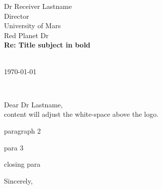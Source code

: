 \documentclass[11pt,a4paper]{letter}
\def\opening#1{\thispagestyle{empty}
{\centering\fromaddress \vspace{1.1in} \\
\hspace*{\longindentation}\today \hspace*{\fill}\par} %
{\raggedright \toname \\ \toaddress \par} %
\vspace{0.3in} %
\noindent #1 %
}
\begin{document}

\begin{letter}
{Dr Receiver Lastname\\
Director\\
University of Mars\\
Red Planet Dr\\
\vspace{0.3in}
\textbf{Re: Title subject in bold}}


\opening{Dear Dr Lastname,}\\

content will adjust the white-space above the logo. 

paragraph 2

para 3

closing para
\\
\closing{Sincerely,}
\end{letter}
\end{document}
